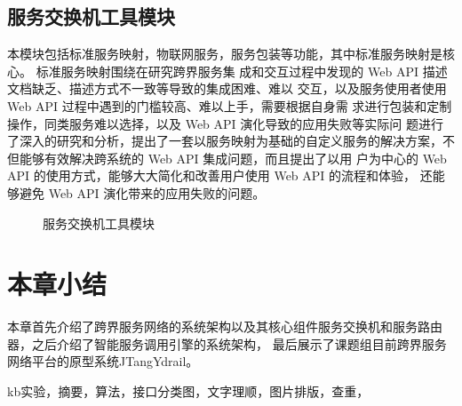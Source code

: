   \subsection{服务交换机工具模块}
  本模块包括标准服务映射，物联网服务，服务包装等功能，其中标准服务映射是核心。
  标准服务映射围绕在研究跨界服务集
  成和交互过程中发现的 Web API 描述文档缺乏、描述方式不一致等导致的集成困难、难以
  交互，以及服务使用者使用 Web API 过程中遇到的门槛较高、难以上手，需要根据自身需
  求进行包装和定制操作，同类服务难以选择，以及 Web API 演化导致的应用失败等实际问
  题进行了深入的研究和分析，提出了一套以服务映射为基础的自定义服务的解决方案，不但能够有效解决跨系统的 Web API 集成问题，而且提出了以用
  户为中心的 Web API 的使用方式，能够大大简化和改善用户使用 Web API 的流程和体验，
还能够避免 Web API 演化带来的应用失败的问题。
  \begin{figure}[htbp]
    \caption{服务交换机工具模块}
    \label{fig:fuwugongju}
    \end{figure}
\section{本章小结}
本章首先介绍了跨界服务网络的系统架构以及其核心组件服务交换机和服务路由器，之后介绍了智能服务调用引擎的系统架构，
最后展示了课题组目前跨界服务网络平台的原型系统JTangYdrail。

kb实验，摘要，算法，接口分类图，文字理顺，图片排版，查重，